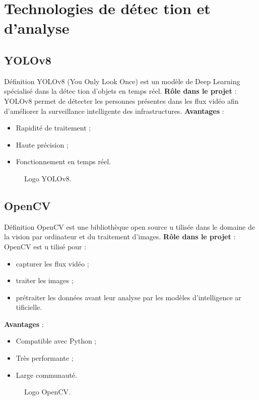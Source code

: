 \documentclass[12pt,a4paper]{report}
\numberwithin{figure}{chapter}
\numberwithin{table}{chapter}
\begin{document}
\section{Technologies de détec tion et d’analyse}
\subsection{YOLOv8}
Déﬁnition
YOLOv8 (You Only Look Once) est un modèle de Deep Learning spécialisé dans la détec tion d’objets
en temps réel.
\textbf{Rôle dans le projet} : \\
YOLOv8 permet de détecter les personnes présentes dans les ﬂux vidéo aﬁn d’améliorer la
surveillance intelligente des infrastructures.
\textbf{Avantages} : \\
\begin{itemize}
  \item Rapidité de traitement ;
  \item Haute précision ;
  \item Fonctionnement en temps réel.
\end{itemize}
\begin{figure}[H]
  \centering
  \caption{Logo YOLOv8.}
\end{figure}
\subsection{OpenCV}
Déﬁnition
OpenCV est une bibliothèque open source u tilisée dans le domaine de la vision par ordinateur et du
traitement d’images.
\textbf{Rôle dans le projet} : \\
OpenCV est u tilisé pour :
\begin{itemize}
  \item capturer les ﬂux vidéo ;
  \item traiter les images ;
  \item prétraiter les données avant leur analyse par les modèles d’intelligence ar tiﬁcielle.
\end{itemize}
\textbf{Avantages} : \\
\begin{itemize}
  \item Compatible avec Python ;
  \item Très performante ;
  \item Large communauté.
\end{itemize}
\begin{figure}[H]
  \centering
  \caption{Logo OpenCV.}
\end{figure}
\end{document}
